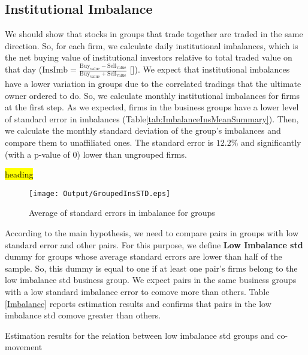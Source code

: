 \FloatBarrier

%
%
\subsection{{Institutional Imbalance}}

	We should show that stocks in groups that trade together are traded in the same direction. So, for each firm, we calculate daily institutional imbalances, which is the net buying value of institutional investors relative to total traded value on that day ($ \text{InsImb} = \frac{\text{Buy}_{\text{value}} - \text{Sell}_{\text{value}}}{\text{Buy}_{\text{value}} + \text{Sell}_{\text{value}}} $ [\cite{seasholes2007predictable}]).
		We expect that institutional imbalances have a lower variation in groups due to the correlated tradings that the ultimate owner ordered to do. So, we calculate monthly institutional imbalances for firms at the first step. As we expected, firms in the business groups have a lower level of standard error in  imbalances (Table\ref{tab:ImbalanceInsMeanSummary}). Then, we calculate the monthly standard deviation of the group's imbalances and compare them to unaffiliated ones. The standard error is  $12.2\%$ and significantly (with a p-value of 0) lower than ungrouped firms. 
		
	{\begin{table}[htbp]
	\caption{\hl{heading}}
		\centering
			\label{tab:ImbalanceInsMeanSummary}%
		\resizebox{0.75\textwidth}{!}{
			
		}
	

				\label{tab:ImbalanceInsStdSummary}%
		\resizebox{0.75\textwidth}{!}{
			
		}
\end{table}}
	\begin{figure}[htbp]
		\centering
		\texttt{[image: Output/GroupedInsSTD.eps]}
				\caption{Average of standard errors in imbalance for groups}
		\label{fig:GroupedInsSTD}
	\end{figure}
	
	According to the main hypothesis, we need to compare pairs in groups with low standard error and other pairs. For this purpose, we define \textbf{Low Imbalance std} dummy for groups whose average standard errors are lower than half of the sample. So, this dummy is equal to one if at least one pair's firms belong to the low imbalance std business group. We expect pairs in the same business groups with a low standard imbalance error to comove more than others. Table \ref{Imbalance} reports estimation results and confirms that pairs in the low imbalance std comove greater than others. 
	
		{\begin{table}[htbp]
			\centering
			\caption{Estimation results for the relation between low imbalance std groups and co-movement}
			\label{Imbalance}
			\resizebox{\textwidth}{!}{
				
			}
	\end{table}}



\FloatBarrier

